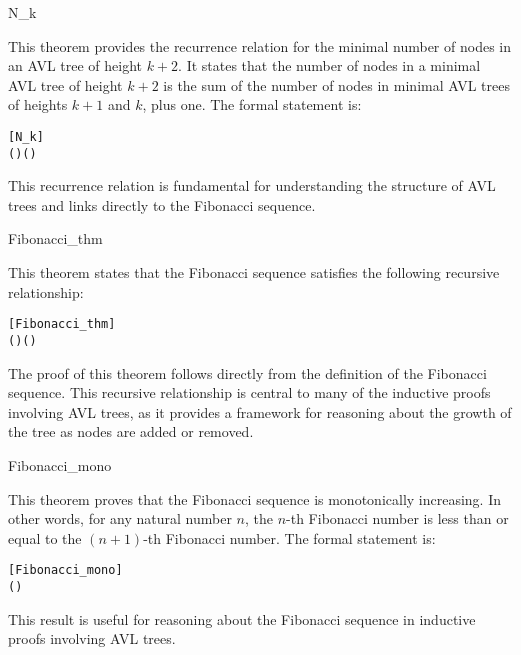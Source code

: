     \begin{thm}{N\_k}

    This theorem provides the recurrence relation for the minimal number of nodes in an AVL tree of height \( k+2 \). It states that the number of nodes in a minimal AVL tree of height \( k+2 \) is the sum of the number of nodes in minimal AVL trees of heights \( k+1 \) and \( k \), plus one. The formal statement is:

    
    \begin{alltt}
    	[N_k]
    	\HOLTokenTurnstile{}  ( \HOLSymConst{\ensuremath{+}} ) \HOLSymConst{=}  ( \HOLSymConst{\ensuremath{+}} ) \HOLSymConst{\ensuremath{+}}   \HOLSymConst{\ensuremath{+}} 
    \end{alltt}
    
    \end{thm}
    This recurrence relation is fundamental for understanding the structure of AVL trees and links directly to the Fibonacci sequence.


    \begin{thm}{Fibonacci\_thm}

    This theorem states that the Fibonacci sequence satisfies the following recursive relationship:
     \begin{alltt}
     	[Fibonacci_thm]
     	\HOLTokenTurnstile{}  ( \HOLSymConst{\ensuremath{+}} ) \HOLSymConst{=}  ( \HOLSymConst{\ensuremath{+}} ) \HOLSymConst{\ensuremath{+}}  
     \end{alltt}
     
    \end{thm}
    The proof of this theorem follows directly from the definition of the Fibonacci sequence. This recursive relationship is central to many of the inductive proofs involving AVL trees, as it provides a framework for reasoning about the growth of the tree as nodes are added or removed.


    \begin{thm}{Fibonacci\_mono}

    This theorem proves that the Fibonacci sequence is monotonically increasing. In other words, for any natural number \( n \), the \( n \)-th Fibonacci number is less than or equal to the \( (n+1) \)-th Fibonacci number. The formal statement is:

    \begin{alltt}
    	[Fibonacci_mono]
    	\HOLTokenTurnstile{}   \HOLSymConst{\HOLTokenLeq{}}  ( \HOLSymConst{\ensuremath{+}} )
    \end{alltt}
    
    \end{thm}
    This result is useful for reasoning about the Fibonacci sequence in inductive proofs involving AVL trees.


